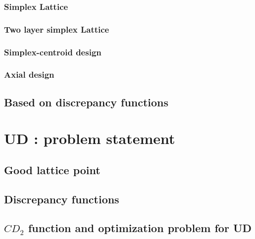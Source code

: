 \documentclass[a4paper,10pt]{llncs}
\begin{document}
\subsubsection{Simplex Lattice}



\subsubsection{Two layer simplex Lattice}


\subsubsection{Simplex-centroid design}


\subsubsection{Axial design}


\subsection{Based on discrepancy functions} %




\section{UD : problem statement } %



\subsection{Good lattice point}
\subsection{Discrepancy functions}
\subsection{$CD_2$ function and optimization problem for UD}
\end{document}
